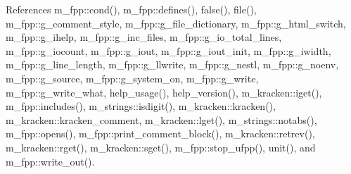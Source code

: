 References m\+\_\+fpp\+::cond(), m\+\_\+fpp\+::defines(), false(), file(), m\+\_\+fpp\+::g\+\_\+comment\+\_\+style, m\+\_\+fpp\+::g\+\_\+file\+\_\+dictionary, m\+\_\+fpp\+::g\+\_\+html\+\_\+switch, m\+\_\+fpp\+::g\+\_\+ihelp, m\+\_\+fpp\+::g\+\_\+inc\+\_\+files, m\+\_\+fpp\+::g\+\_\+io\+\_\+total\+\_\+lines, m\+\_\+fpp\+::g\+\_\+iocount, m\+\_\+fpp\+::g\+\_\+iout, m\+\_\+fpp\+::g\+\_\+iout\+\_\+init, m\+\_\+fpp\+::g\+\_\+iwidth, m\+\_\+fpp\+::g\+\_\+line\+\_\+length, m\+\_\+fpp\+::g\+\_\+llwrite, m\+\_\+fpp\+::g\+\_\+nestl, m\+\_\+fpp\+::g\+\_\+noenv, m\+\_\+fpp\+::g\+\_\+source, m\+\_\+fpp\+::g\+\_\+system\+\_\+on, m\+\_\+fpp\+::g\+\_\+write, m\+\_\+fpp\+::g\+\_\+write\+\_\+what, help\+\_\+usage(), help\+\_\+version(), m\+\_\+kracken\+::iget(), m\+\_\+fpp\+::includes(), m\+\_\+strings\+::isdigit(), m\+\_\+kracken\+::kracken(), m\+\_\+kracken\+::kracken\+\_\+comment, m\+\_\+kracken\+::lget(), m\+\_\+strings\+::notabs(), m\+\_\+fpp\+::opens(), m\+\_\+fpp\+::print\+\_\+comment\+\_\+block(), m\+\_\+kracken\+::retrev(), m\+\_\+kracken\+::rget(), m\+\_\+kracken\+::sget(), m\+\_\+fpp\+::stop\+\_\+ufpp(), unit(), and m\+\_\+fpp\+::write\+\_\+out().

